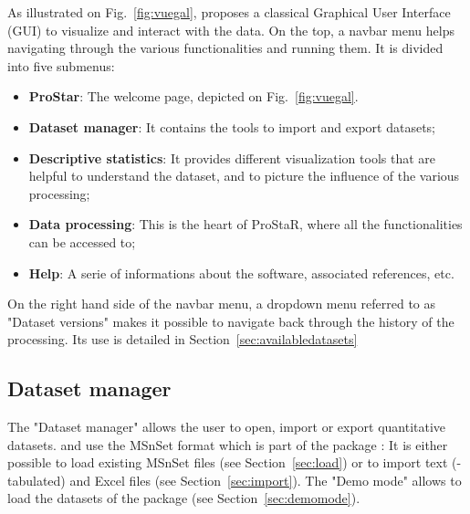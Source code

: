 \documentclass[12pt]{article}
\begin{document}
{As illustrated on Fig.~\ref{fig:vuegal},  proposes a 
classical Graphical User Interface (GUI) to visualize and interact with the 
data. On the top, a navbar menu helps navigating through the various 
 functionalities and running them. It is divided into five 
submenus:
\begin{itemize}
\item \textbf {ProStar}: The welcome page, depicted on Fig.~\ref{fig:vuegal}.
\item \textbf {Dataset manager}: It contains the tools to import and export 
datasets;
\item \textbf {Descriptive statistics}: It provides different visualization 
tools that are helpful to understand the dataset, and to picture the 
influence of the various processing;
\item \textbf {Data processing}: This is the heart of ProStaR, where all 
the  functionalities can be accessed to; 
\item \textbf {Help}: A serie of informations about the software, 
associated references, etc.
\end{itemize}
}

{On the right hand side of the navbar menu, a dropdown menu referred to as 
"Dataset versions" makes it possible to navigate back through the history of 
the processing. Its use is detailed in Section~\ref{sec:availabledatasets}
}


\subsection{Dataset manager}
The "Dataset manager" allows the user to open, import or export quantitative 
datasets.  and  use the MSnSet format which 
is part of the package :
It is either possible to load existing MSnSet files (see 
Section~\ref{sec:load}) or to import text (-tabulated) and Excel files (see 
Section~\ref{sec:import}). The "Demo mode" allows to load the datasets of the 
package  (see Section~\ref{sec:demomode}).
\end{document}
